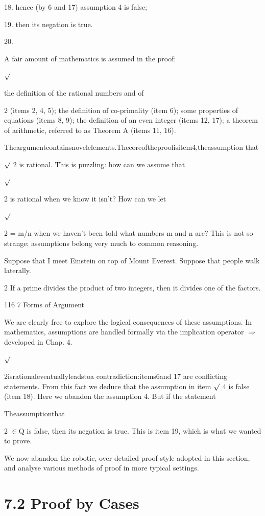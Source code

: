 \documentclass[11pt]{article}
\theoremstyle{plain}
\theoremstyle{definition}
\begin{document}
18. hence (by 6 and 17) assumption 4 is false;

19. then its negation is true.

20. 

A fair amount of mathematics is assumed in the proof:

$\surd$

the definition of the rational numbers and of

2 (items 2, 4, 5); the definition of co-primality (item 6); some properties of equations (items 8, 9); the definition of an even integer (items 12, 17); a theorem of arithmetic, referred to as Theorem A (items 11, 16).

Theargumentcontainsnovelelements.Thecoreoftheproofisitem4,theassumption that

$\surd$ 2 is rational. This is puzzling: how can we assume that

$\surd$

2 is rational when we know it isn't? How can we let

$\surd$

2 = m/n when we haven't been told what numbers m and n are? This is not so strange; assumptions belong very much to common reasoning.

Suppose that I meet Einstein on top of Mount Everest. Suppose that people walk laterally.

2 If a prime divides the product of two integers, then it divides one of the factors.

116 7 Forms of Argument

We are clearly free to explore the logical consequences of these assumptions. In mathematics, assumptions are handled formally via the implication operator $\Rightarrow$developed in Chap. 4.

$\surd$

2isrationaleventuallyleadstoa contradiction:items6and 17 are conflicting statements. From this fact we deduce that the assumption in item $\surd$ 4 is false (item 18). Here we abandon the assumption 4. But if the statement

Theassumptionthat

2 $\in$Q is false, then its negation is true. This is item 19, which is what we wanted to prove.

We now abandon the robotic, over-detailed proof style adopted in this section, and analyse various methods of proof in more typical settings.

\section{7.2 Proof by Cases}
\end{document}
